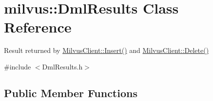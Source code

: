 \hypertarget{classmilvus_1_1_dml_results}{}\section{milvus\+:\+:Dml\+Results Class Reference}
\label{classmilvus_1_1_dml_results}


Result returned by \hyperlink{classmilvus_1_1_milvus_client_a64a2dca576e0933571a6889910d56390}{Milvus\+Client\+::\+Insert()} and \hyperlink{classmilvus_1_1_milvus_client_a271b16333636621f24aaf89993c72301}{Milvus\+Client\+::\+Delete()}  




{\ttfamily \#include $<$Dml\+Results.\+h$>$}

\subsection*{Public Member Functions}

